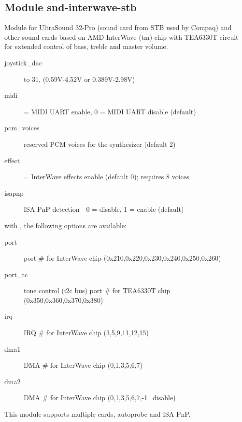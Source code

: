 \documentclass[a4paper,8pt,english]{sphinxmanual}
\begin{document}
\subsection{Module snd-interwave-stb}
\label{sound/alsa-configuration:module-snd-interwave-stb}
Module for UltraSound 32-Pro (sound card from STB used by Compaq)
and other sound cards based on AMD InterWave (tm) chip with TEA6330T
circuit for extended control of bass, treble and master volume.
\begin{description}
\item[{joystick\_dac}]  to 31, (0.59V-4.52V or 0.389V-2.98V)

\item[{midi}]  = MIDI UART enable, 0 = MIDI UART disable (default)

\item[{pcm\_voices}] \leavevmode
reserved PCM voices for the synthesizer (default 2)

\item[{effect}]  = InterWave effects enable (default 0); requires 8 voices

\item[{isapnp}] \leavevmode
ISA PnP detection - 0 = disable, 1 = enable (default)

\end{description}

with , the following options are available:
\begin{description}
\item[{port}] \leavevmode
port \# for InterWave chip (0x210,0x220,0x230,0x240,0x250,0x260)

\item[{port\_tc}] \leavevmode
tone control (i2c bus) port \# for TEA6330T chip (0x350,0x360,0x370,0x380)

\item[{irq}] \leavevmode
IRQ \# for InterWave chip (3,5,9,11,12,15)

\item[{dma1}] \leavevmode
DMA \# for InterWave chip (0,1,3,5,6,7)

\item[{dma2}] \leavevmode
DMA \# for InterWave chip (0,1,3,5,6,7,-1=disable)

\end{description}

This module supports multiple cards, autoprobe and ISA PnP.
\end{document}
